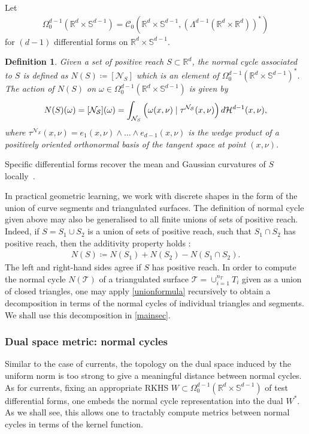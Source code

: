 \documentclass[sn-mathphys-num]{sn-jnl}%
\theoremstyle{thmstyleone}%
\theoremstyle{thmstyletwo}%
\theoremstyle{thmstylethree}%
\newtheorem{definition}{Definition}%
\numberwithin{remark}{section}
\numberwithin{definition}{section}
\numberwithin{equation}{section}
\numberwithin{theorem}{section}
\newcommand{\R}{\ensuremath{\mathbb{R}}}%
\begin{document}
Let
 \begin{align*}
 \Omega_{0}^{d-1}(\R^{d}\times \mathbb{S}^{d-1}) = \mathcal{C}_{0}(\R^{d}\times \mathbb{S}^{d-1},(\Lambda^{d-1}(\R^{d}\times \R^{d} )) ^{*})
 \end{align*}
 for $(d-1)$ differential forms on $\R^{d}\times \mathbb{S}^{d-1}$.
\begin{definition}
    Given a set of positive reach $S\subset \R^{d}$, the normal cycle associated to $S$ is defined as $N(S)\coloneq[\mathcal{N}_{S}]$ which is an element of $\Omega_{0}^{d-1}(\R^{d}\times \mathbb{S}^{d-1})^{*}$. The action of $N(S)$ on $\omega \in \Omega_{0}^{d-1}(\R^{d}\times \mathbb{S}^{d-1})$ is given by
    \begin{align}\label{NCaction}
        N(S)(\omega) = [\mathcal{N_{S}}](\omega) = \int_{\mathcal{N}_{S}}{\Bigl(\omega(x,\nu) \mid \tau^{\mathcal{N_{S}}}(x,\nu)\Bigr)\,d\mathcal{H}^{d-1}(x,\nu)},
    \end{align}
    where $\tau^{\mathcal{N_{S}}}(x,\nu) = e_{1}(x,\nu) \wedge \dots \wedge e_{d-1}(x,\nu)$ is the wedge product of a positively oriented orthonormal basis of the tangent space at point $(x,\nu)$.
\end{definition}
Specific differential forms recover the mean and Gaussian curvatures of $S$ locally~\cite{NCThesis}.

In practical geometric learning, we work with discrete shapes in the form of the union of curve segments and triangulated surfaces. The definition of normal cycle given above may also be generalised \cite{NCpaper,NCThesis} to all finite unions of sets of positive reach. Indeed, if $S = S_{1}\cup S_{2}$ is a union of sets of positive reach, such that $S_{1}\cap S_{2}$ has positive reach, then
the additivity property holds \cite{Federer1959}:
\begin{align}\label{unionformula}
    N(S) \coloneq N({S_{1}}) + N({S_{2}}) - N({S_{1}\cap S_{2}}).
\end{align}
The left and right-hand sides agree if $S$ has positive reach. In order to compute the normal cycle $N(\mathcal{T})$ of a triangulated surface $\mathcal{T} = \cup_{i=1}^{n_{T}}{T_{i}}$ given as a union of closed triangles, one may apply \cref{unionformula} recursively to obtain a decomposition in terms of the normal cycles of individual triangles and segments. We shall use this decomposition in \cref{mainsec}. 


\subsubsection{Dual space metric: normal cycles}
Similar to the case of currents, the topology on the dual space induced by the uniform norm is too strong to give a meaningful distance between normal cycles. As for currents, fixing an appropriate RKHS $W\subset \Omega_{0}^{d-1}(\R^{d}\times \mathbb{S}^{d-1})$ of test differential forms, one embeds  the normal cycle representation into the dual $W^{*}$. As we shall see, this allows one to tractably compute metrics  between normal cycles in terms of the kernel function.
\end{document}
